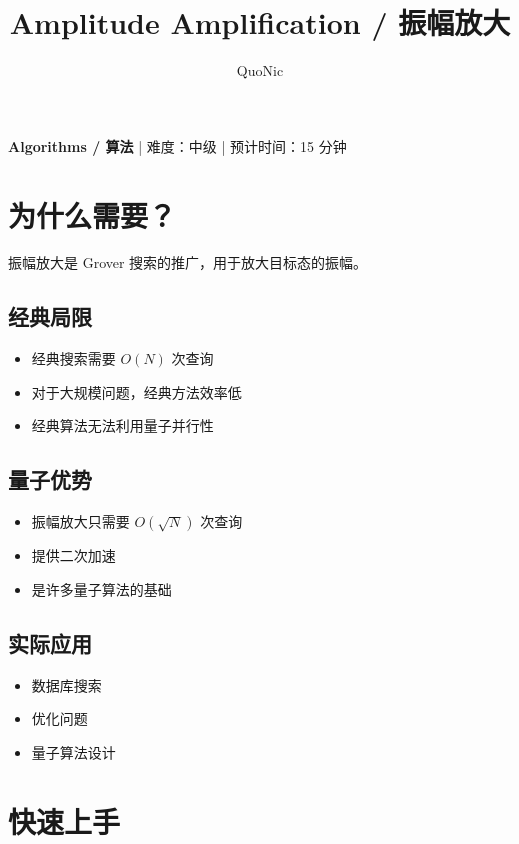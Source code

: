 \documentclass[12pt,a4paper]{article}
\title{Amplitude Amplification / 振幅放大}
\author{QuoNic}
\date{}
\begin{document}
\maketitle

\begin{center}
\textbf{Algorithms / 算法} | 难度：中级 | 预计时间：15 分钟
\end{center}

\tableofcontents
\newpage

\section{为什么需要？}

振幅放大是 Grover 搜索的推广，用于放大目标态的振幅。

\subsection{经典局限}
\begin{itemize}
  \item 经典搜索需要 $O(N)$ 次查询
  \item 对于大规模问题，经典方法效率低
  \item 经典算法无法利用量子并行性
\end{itemize}

\subsection{量子优势}
\begin{itemize}
  \item 振幅放大只需要 $O(\sqrt{N})$ 次查询
  \item 提供二次加速
  \item 是许多量子算法的基础
\end{itemize}

\subsection{实际应用}
\begin{itemize}
  \item 数据库搜索
  \item 优化问题
  \item 量子算法设计
\end{itemize}

\section{快速上手}
\end{document}
